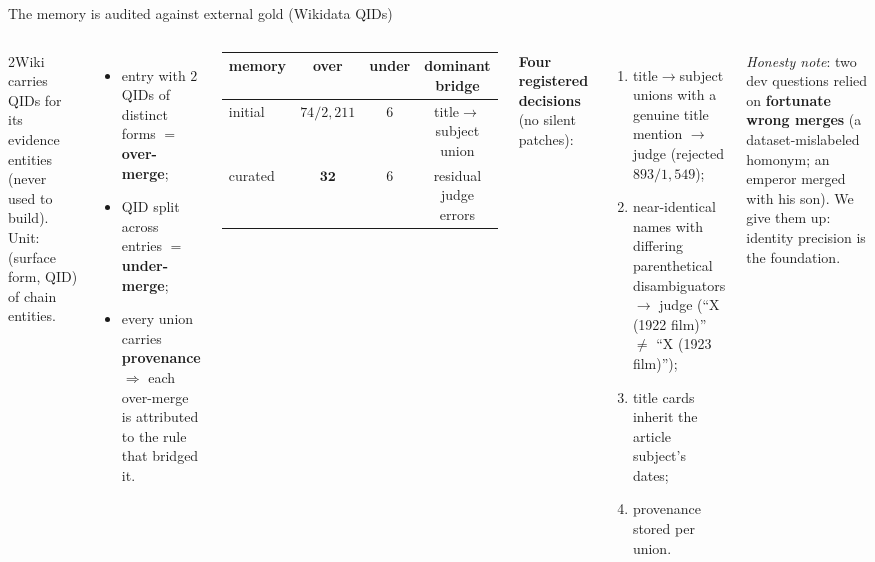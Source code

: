 \documentclass[aspectratio=169,10pt]{beamer}
\newcommand{\good}[1]{\textcolor{verde}{\textbf{#1}}}
\newcommand{\bad}[1]{\textcolor{teja}{\textbf{#1}}}
\begin{document}
\begin{frame}{The memory is audited against external gold (Wikidata QIDs)}
\begin{columns}[T]
\footnotesize
2Wiki carries QIDs for its evidence entities (never used to build). Unit:
(surface form, QID) of chain entities.
\begin{itemize}\footnotesize
\item entry with $2$ QIDs of distinct forms $=$ \textbf{over-merge};
\item QID split across entries $=$ \textbf{under-merge};
\item every union carries \textbf{provenance} $\Rightarrow$ each over-merge
  is attributed to the rule that bridged it.
\end{itemize}
\begin{center}\small
\begin{tabular}{lccc}
\toprule
memory & over & under & dominant bridge\\
\midrule
initial & $74/2{,}211$ & $6$ & title$\to$subject union\\
curated & \good{$\mathbf{32}$} & $6$ & residual judge errors\\
\bottomrule
\end{tabular}
\end{center}
\footnotesize
\textbf{Four registered decisions} (no silent patches):
\begin{enumerate}\footnotesize
\item title$\to$subject unions with a genuine title mention $\to$ judge
  (rejected $893/1{,}549$);
\item near-identical names with differing parenthetical disambiguators
  $\to$ judge (``X (1922 film)'' $\ne$ ``X (1923 film)'');
\item title cards inherit the article subject's dates;
\item provenance stored per union.
\end{enumerate}
\emph{Honesty note}: two dev questions relied on \bad{fortunate wrong
merges} (a dataset-mislabeled homonym; an emperor merged with his son).
We give them up: identity precision is the foundation.
\end{columns}
\end{frame}
\end{document}
